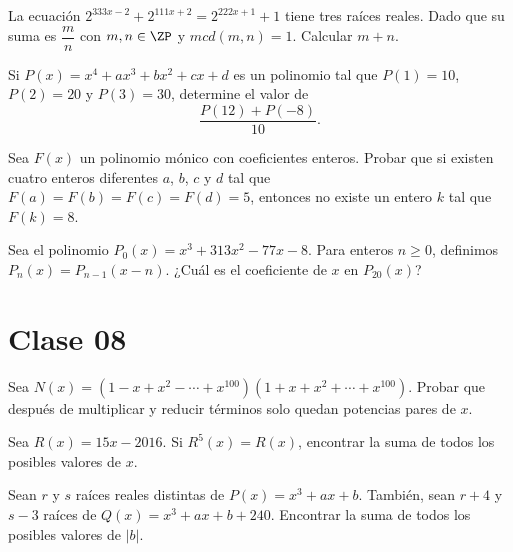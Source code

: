     \begin{section-problem}
        La ecuación $2^{333x - 2} + 2^{111x + 2} = 2^{222x + 1} + 1$ tiene tres raíces reales.
        Dado que su suma es $\dfrac{m}{n}$ con $m, n \in \ZP$ y $mcd(m, n) = 1$.
        Calcular $m + n$.
    \end{section-problem}

    \begin{section-problem}
        Si $P(x) = x^4 + ax^3 + bx^2 + cx + d$ es un polinomio tal que $P(1) = 10$, $P(2) = 20$ y $P(3) = 30$, determine el valor de
        \[\frac{P(12) + P(-8)}{10}.\]
    \end{section-problem}

    \begin{section-problem}
        Sea $F(x)$ un polinomio mónico con coeficientes enteros.
        Probar que si existen cuatro enteros diferentes $a$, $b$, $c$ y $d$ tal que $F(a) = F(b) = F(c)  = F(d) = 5$,
        entonces no existe un entero $k$ tal que $F(k) = 8$.
    \end{section-problem}

    \begin{section-problem}
        Sea el polinomio $P_0(x) = x^3 + 313x^2 - 77x - 8$.
        Para enteros $n \geq 0$, definimos $P_n(x) = P_{n - 1}(x - n)$.
        ¿Cuál es el coeficiente de $x$ en $P_{20}(x)$?
    \end{section-problem}



\section{Clase 08}

\begin{section-problem}
    Sea $N(x) = (1 - x + x^2 - \cdots + x^{100})(1 + x + x^2 + \cdots + x^{100})$.
    Probar que después de multiplicar y reducir términos solo quedan potencias pares de $x$.
\end{section-problem}

\begin{section-problem}
    Sea $R(x) = 15x - 2016$.
    Si $R^5(x) = R(x)$, encontrar la suma de todos los posibles valores de $x$.
\end{section-problem}

\begin{section-problem}
    Sean $r$ y $s$ raíces reales distintas de $P(x) = x^3 + ax + b$.
    También, sean $r + 4$ y $s - 3$ raíces de $Q(x) = x^3 + ax + b + 240$.
    Encontrar la suma de todos los posibles valores de $|b|$.
\end{section-problem}


